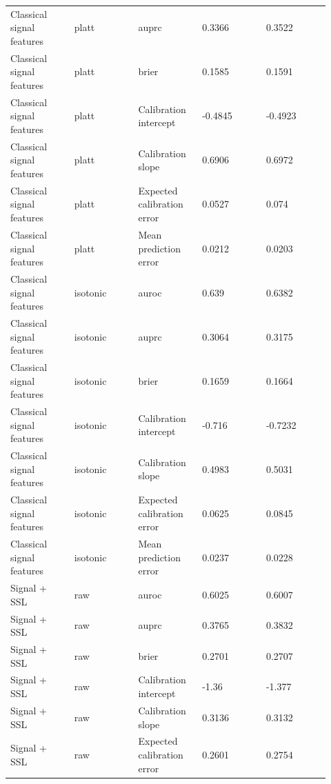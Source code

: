 \documentclass[utf8]{frontiers_suppmat}
\begin{document}
\begin{landscape}
\begin{longtable}{L{0.184\linewidth} L{0.184\linewidth} L{0.184\linewidth} L{0.184\linewidth} L{0.184\linewidth}}
Classical signal features & platt & auprc & 0.\allowbreak{}3366 & 0.\allowbreak{}3522 \\
Classical signal features & platt & brier & 0.\allowbreak{}1585 & 0.\allowbreak{}1591 \\
Classical signal features & platt & Calibration intercept & -\allowbreak{}0.\allowbreak{}4845 & -\allowbreak{}0.\allowbreak{}4923 \\
Classical signal features & platt & Calibration slope & 0.\allowbreak{}6906 & 0.\allowbreak{}6972 \\
Classical signal features & platt & Expected calibration error & 0.\allowbreak{}0527 & 0.\allowbreak{}074 \\
Classical signal features & platt & Mean prediction error & 0.\allowbreak{}0212 & 0.\allowbreak{}0203 \\
Classical signal features & isotonic & auroc & 0.\allowbreak{}639 & 0.\allowbreak{}6382 \\
Classical signal features & isotonic & auprc & 0.\allowbreak{}3064 & 0.\allowbreak{}3175 \\
Classical signal features & isotonic & brier & 0.\allowbreak{}1659 & 0.\allowbreak{}1664 \\
Classical signal features & isotonic & Calibration intercept & -\allowbreak{}0.\allowbreak{}716 & -\allowbreak{}0.\allowbreak{}7232 \\
Classical signal features & isotonic & Calibration slope & 0.\allowbreak{}4983 & 0.\allowbreak{}5031 \\
Classical signal features & isotonic & Expected calibration error & 0.\allowbreak{}0625 & 0.\allowbreak{}0845 \\
Classical signal features & isotonic & Mean prediction error & 0.\allowbreak{}0237 & 0.\allowbreak{}0228 \\
Signal + SSL & raw & auroc & 0.\allowbreak{}6025 & 0.\allowbreak{}6007 \\
Signal + SSL & raw & auprc & 0.\allowbreak{}3765 & 0.\allowbreak{}3832 \\
Signal + SSL & raw & brier & 0.\allowbreak{}2701 & 0.\allowbreak{}2707 \\
Signal + SSL & raw & Calibration intercept & -\allowbreak{}1.\allowbreak{}36 & -\allowbreak{}1.\allowbreak{}377 \\
Signal + SSL & raw & Calibration slope & 0.\allowbreak{}3136 & 0.\allowbreak{}3132 \\
Signal + SSL & raw & Expected calibration error & 0.\allowbreak{}2601 & 0.\allowbreak{}2754 \\

\end{longtable}
\end{landscape}
\end{document}
